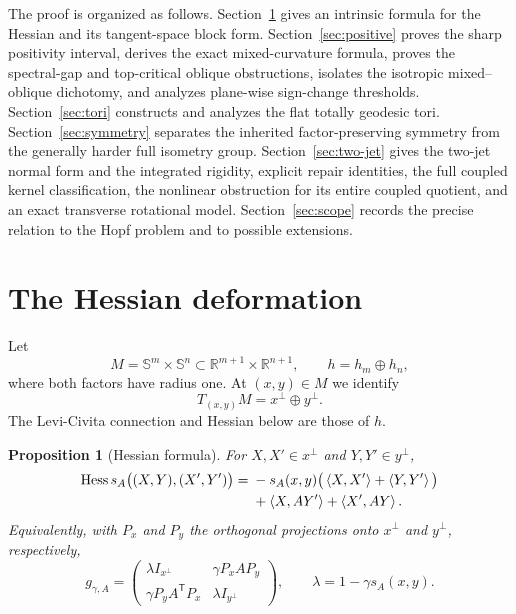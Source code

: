 \documentclass[11pt]{amsart}
\newtheorem{proposition}[theorem]{Proposition}
\theoremstyle{definition}
\theoremstyle{remark}
\DeclareMathOperator{\Hess}{Hess}
\newcommand{\R}{\mathbb R}
\newcommand{\Sph}{\mathbb S}
\newcommand{\ip}[2]{\left\langle #1,#2\right\rangle}
\begin{document}
The proof is organized as follows.  Section~\ref{sec:hessian} gives an
intrinsic formula for the Hessian and its tangent-space block form.
Section~\ref{sec:positive} proves the sharp positivity interval,
derives the exact mixed-curvature formula, proves the spectral-gap and
top-critical oblique obstructions, isolates the
isotropic mixed--oblique dichotomy, and analyzes plane-wise
sign-change thresholds.
Section~\ref{sec:tori} constructs and analyzes the flat totally
geodesic tori.  Section~\ref{sec:symmetry} separates the inherited
factor-preserving symmetry from the generally harder full isometry
group.  Section~\ref{sec:two-jet} gives the two-jet normal form and
the integrated rigidity, explicit repair identities, the full coupled
kernel classification, the nonlinear obstruction for its entire
coupled quotient, and an exact transverse rotational model.
Section~\ref{sec:scope} records
the precise relation to the Hopf problem and to possible extensions.

\section{The Hessian deformation}\label{sec:hessian}

Let
\[
 M=\Sph^m\times\Sph^n
 \subset\R^{m+1}\times\R^{n+1},
 \qquad h=h_m\oplus h_n,
\]
where both factors have radius one.  At $(x,y)\in M$ we identify
\[
 T_{(x,y)}M=x^\perp\oplus y^\perp.
\]
The Levi-Civita connection and Hessian below are those of $h$.

\begin{proposition}[Hessian formula]\label{prop:hessian}
For $X,X'\in x^\perp$ and $Y,Y'\in y^\perp$,
\begin{align}
 \Hess s_A\big((X,Y),(X',Y')\big)
 ={}&-s_A(x,y)\big(\ip{X}{X'}+\ip{Y}{Y'}\big) \notag\\
 &+\ip{X}{AY'}+\ip{X'}{AY}.       \label{eq:hessian}
\end{align}
Equivalently, with $P_x$ and $P_y$ the orthogonal projections onto
$x^\perp$ and $y^\perp$, respectively,
\begin{equation}\label{eq:block}
 g_{\gamma,A}=
 \begin{pmatrix}
  \lambda I_{x^\perp} & \gamma P_xAP_y\\
  \gamma P_yA^{\mathsf T}P_x & \lambda I_{y^\perp}
 \end{pmatrix},
 \qquad \lambda=1-\gamma s_A(x,y).
\end{equation}
\end{proposition}
\end{document}
